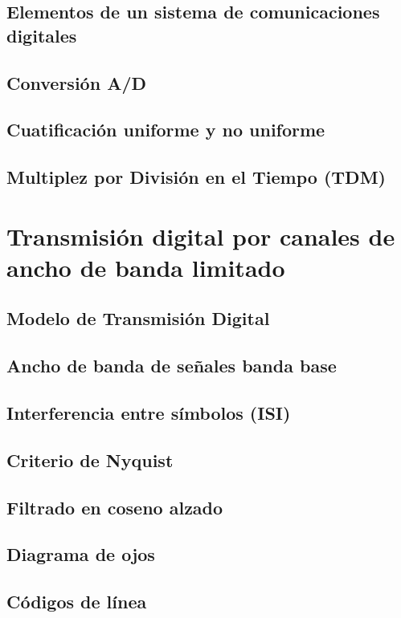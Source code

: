 \documentclass[a4paper]{book}
\begin{document}
\section{\texorpdfstring{Elementos de un sistema de comunicaciones\\ digitales}{Elementos de un sistema de comunicaciones digitales}}
\section{Conversión A/D}
\section{Cuatificación uniforme y no uniforme}
\section{Multiplez por División en el Tiempo (TDM)}

\chapter{Transmisión digital por canales de ancho de banda limitado}
\section{Modelo de Transmisión Digital}
\section{Ancho de banda de señales banda base}
\section{Interferencia entre símbolos (ISI)}
\section{Criterio de Nyquist}
\section{Filtrado en coseno alzado}
\section{Diagrama de ojos}
\section{Códigos de línea}
\end{document}
